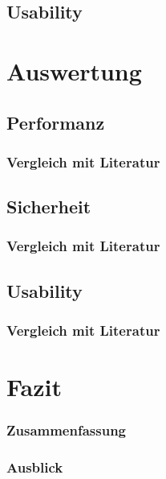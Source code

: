 \section{Usability}

\chapter{Auswertung}

\section{Performanz}

\subsection{Vergleich mit Literatur}

\section{Sicherheit}

\subsection{Vergleich mit Literatur}

\section{Usability}

\subsection{Vergleich mit Literatur}

\chapter{Fazit}

\subsection{Zusammenfassung}

\subsection{Ausblick}
